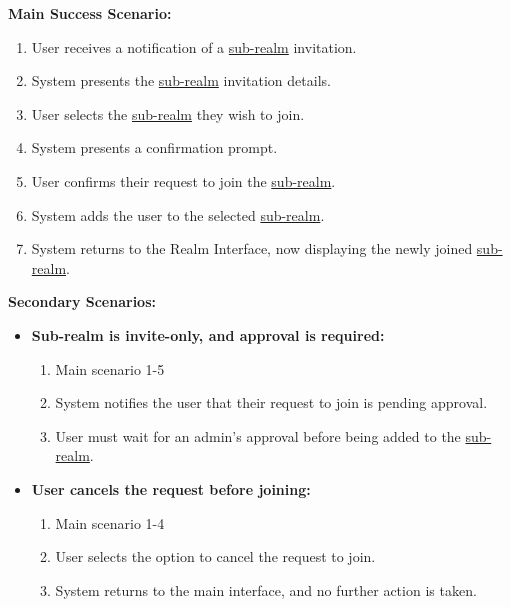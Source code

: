 \documentclass{article}
\begin{document}
\begin{enumerate}[label=\textbf{UC\arabic*}]
          \textbf{Main Success Scenario:}
          \begin{enumerate}[label=\textbf{\arabic*.}]
              \item User receives a notification of a \hyperref[def:sub_realm]{sub-realm} invitation.
              \item System presents the \hyperref[def:sub_realm]{sub-realm} invitation details.
              \item User selects the \hyperref[def:sub_realm]{sub-realm} they wish to join.
              \item System presents a confirmation prompt.
              \item User confirms their request to join the \hyperref[def:sub_realm]{sub-realm}.
              \item System adds the user to the selected \hyperref[def:sub_realm]{sub-realm}.
              \item System returns to the Realm Interface, now displaying the newly joined \hyperref[def:sub_realm]{sub-realm}.
          \end{enumerate}

          \textbf{Secondary Scenarios:}
          \begin{itemize}
              \item[{}] \textbf{Sub-realm is invite-only, and approval is required:}
                    \begin{enumerate}[label=\textbf{\arabic*.}]
                        \item Main scenario 1-5
                        \item System notifies the user that their request to join is pending approval.
                        \item User must wait for an admin’s approval before being added to the \hyperref[def:sub_realm]{sub-realm}.
                    \end{enumerate}

              \item[{}] \textbf{User cancels the request before joining:}
                    \begin{enumerate}[label=\textbf{\arabic*.}]
                        \item Main scenario 1-4
                        \item User selects the option to cancel the request to join.
                        \item System returns to the main interface, and no further action is taken.
                    \end{enumerate}
          \end{itemize}


\end{enumerate}
\end{document}
